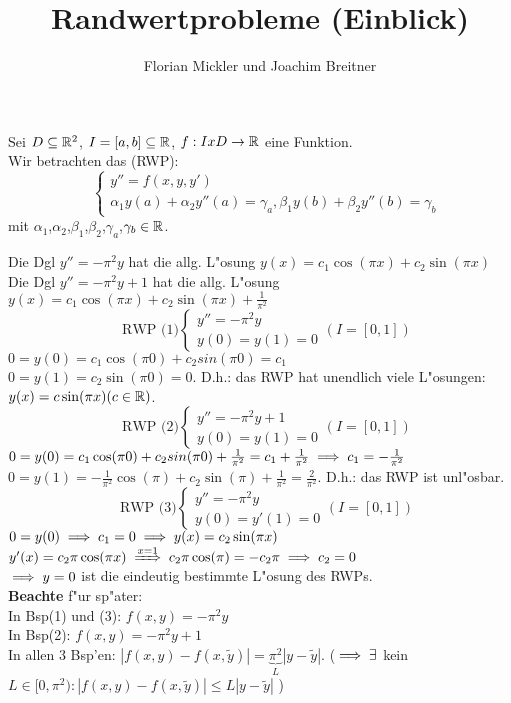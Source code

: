 \documentclass{article}
\title{Randwertprobleme (Einblick)}
\author{Florian Mickler und Joachim Breitner}
\begin{document}
\maketitle

Sei $D \subseteq \mathbb{R}^2$, $I=[a,b]\subseteq \mathbb{R}$, $f:I x D \to \mathbb{R}$ eine Funktion. \\
Wir betrachten das  (RWP):
\[ \quad
\begin{cases}
y''=f(x,y,y') \\ \alpha_1 y(a) + \alpha_2 y''(a) = \gamma_a, \beta_1 y(b) + \beta_2 y''(b) = \gamma_b
\end{cases}
\]
mit $\alpha_1$,$\alpha_2$,$\beta_1$,$\beta_2$,$\gamma_a$,$\gamma_b \in \mathbb{R}$.\\
\begin{beispiel}
Die Dgl $y''=-\pi^2 y$ hat die allg. L"osung $y(x) = c_1 \cos(\pi x)+c_2 \sin(\pi x)$\\
Die Dgl $y''=-\pi^2 y + 1$ hat die allg. L"osung $y(x) = c_1 \cos(\pi x)+c_2 \sin(\pi x)+\frac{1}{\pi^2}$\\
\[ \quad
\text{RWP (1)}
\begin{cases}
y'' = -\pi^2 y\\
y(0)=y(1)=0
\end{cases}
(I=[0,1])
\]
$0=y(0)=c_1\cos(\pi0) + c_2sin(\pi0)=c_1$\\
$0=y(1)=c_2\sin(\pi0)=0$. D.h.: das RWP hat unendlich viele L"osungen: $y(x)=c\sin(\pi x) (c\in\mathbb{R})$.\\
\[ \quad
\text{RWP (2)}
\begin{cases}
y'' = -\pi^2 y+1\\
y(0)=y(1)=0
\end{cases}
(I=[0,1])
\]
$0=y(0)=c_1\cos(\pi0) + c_2sin(\pi0)+\frac{1}{\pi^2}=c_1+\frac{1}{\pi^2}\implies c_1=-\frac{1}{\pi^2}$\\
$0=y(1)=-\frac{1}{\pi^2}\cos(\pi)+c_2\sin(\pi)+\frac{1}{\pi^2}=\frac{2}{\pi^2}$. D.h.: das RWP ist unl"osbar.\\
\[ \quad
\text{RWP (3)}
\begin{cases}
y'' = -\pi^2y\\
y(0)=y'(1)=0
\end{cases}
(I=[0,1])
\]
$0=y(0)\implies c_1=0 \implies y(x)=c_2\sin(\pi x)$\\
$y'(x) = c_2\pi\cos(\pi x) \folgtwegen{x=1} c_2\pi\cos(\pi) = -c_2\pi \folgt c_2 = 0$\\
$\implies y=0$ ist die eindeutig bestimmte L"osung des RWPs.\\

\textbf{Beachte} f"ur sp"ater:\\
In Bsp(1) und (3): $f(x,y)=-\pi^2 y$\\
In Bsp(2): $f(x,y)=-\pi^2 y+1$\\
In allen 3 Bsp'en: $|f(x,y)-f(x,\tilde y)|=\underbrace{\pi^2}_L |y-\tilde y|$.
($\implies \exists$ kein $L\in[0,\pi^2):|f(x,y)-f(x,\tilde y)|\le L|y-\tilde y|$ )
\end{beispiel}  
\end{document}
